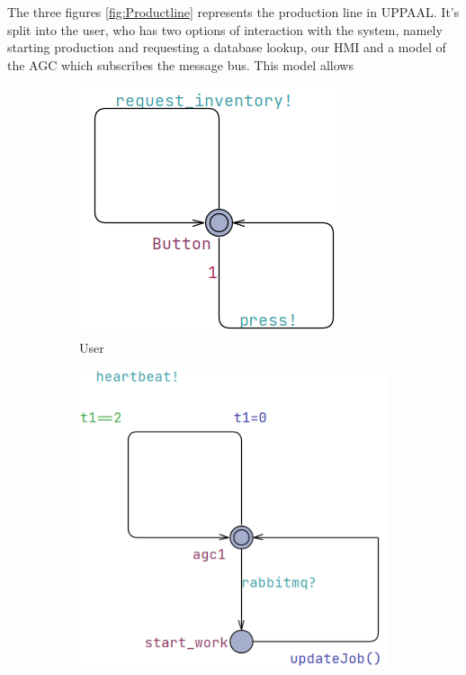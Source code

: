 The three figures \ref{fig:Productline} represents the production line in UPPAAL. It's split into the user, who has two options of interaction with the system, namely starting production and requesting a database lookup, our HMI and a model of the AGC which subscribes the message bus. This model allows 
\begin{figure}[ht]
  \centering
  \begin{subfigure}[b]{0.4\linewidth}
    \includegraphics[width=\linewidth]{images/User.png}
     \caption{User}
  \end{subfigure}
  \begin{subfigure}[b]{0.5\linewidth}
    \includegraphics[width=\linewidth]{images/AGC.png}

\end{subfigure}
\end{figure}

